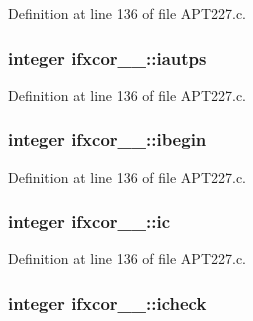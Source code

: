 Definition at line 136 of file A\+P\+T227.\+c.

\subsubsection[{\texorpdfstring{iautps}{iautps}}]{\setlength{\rightskip}{0pt plus 5cm}integer ifxcor\+\_\+\_\+\+::iautps}\hypertarget{structifxcor__1___ad9597f2ed7561bf2d151ac0f769c9b87}{}\label{structifxcor__1___ad9597f2ed7561bf2d151ac0f769c9b87}


Definition at line 136 of file A\+P\+T227.\+c.

\subsubsection[{\texorpdfstring{ibegin}{ibegin}}]{\setlength{\rightskip}{0pt plus 5cm}integer ifxcor\+\_\+\_\+\+::ibegin}\hypertarget{structifxcor__1___aeb0a611272568daee5df6c3f4be219c5}{}\label{structifxcor__1___aeb0a611272568daee5df6c3f4be219c5}


Definition at line 136 of file A\+P\+T227.\+c.

\subsubsection[{\texorpdfstring{ic}{ic}}]{\setlength{\rightskip}{0pt plus 5cm}integer ifxcor\+\_\+\_\+\+::ic}\hypertarget{structifxcor__1___abb5a5215673cd64d63023730dbf32045}{}\label{structifxcor__1___abb5a5215673cd64d63023730dbf32045}


Definition at line 136 of file A\+P\+T227.\+c.

\subsubsection[{\texorpdfstring{icheck}{icheck}}]{\setlength{\rightskip}{0pt plus 5cm}integer ifxcor\+\_\+\_\+\+::icheck}\hypertarget{structifxcor__1___a18bbdb0a71498612f0d7cf3b03e326b0}{}\label{structifxcor__1___a18bbdb0a71498612f0d7cf3b03e326b0}


